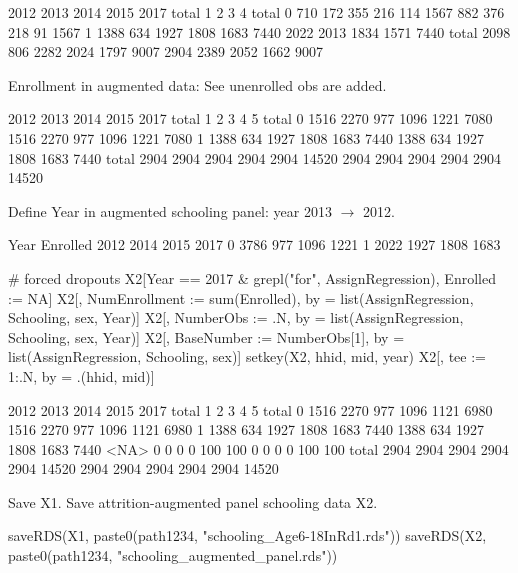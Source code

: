 \begin{Schunk}
\begin{Soutput}
      2012 2013 2014 2015 2017 total    1    2    3    4 total
0      710  172  355  216  114  1567  882  376  218   91  1567
1     1388  634 1927 1808 1683  7440 2022 2013 1834 1571  7440
total 2098  806 2282 2024 1797  9007 2904 2389 2052 1662  9007
\end{Soutput}
\end{Schunk}
Enrollment in augmented data: See unenrolled obs are added.
\begin{Schunk}
\begin{Soutput}
      2012 2013 2014 2015 2017 total    1    2    3    4    5 total
0     1516 2270  977 1096 1221  7080 1516 2270  977 1096 1221  7080
1     1388  634 1927 1808 1683  7440 1388  634 1927 1808 1683  7440
total 2904 2904 2904 2904 2904 14520 2904 2904 2904 2904 2904 14520
\end{Soutput}
\end{Schunk}
Define \textsf{Year} in augmented schooling panel: year 2013 $\rightarrow$ 2012.
\begin{Schunk}
\begin{Soutput}
        Year
Enrolled 2012 2014 2015 2017
       0 3786  977 1096 1221
       1 2022 1927 1808 1683
\end{Soutput}
\end{Schunk}
\begin{Schunk}
\begin{Sinput}
# forced dropouts
X2[Year == 2017 & grepl("for", AssignRegression), Enrolled := NA]
X2[, NumEnrollment := sum(Enrolled), by = list(AssignRegression, Schooling, sex, Year)]
X2[, NumberObs := .N, by = list(AssignRegression, Schooling, sex, Year)]
X2[, BaseNumber := NumberObs[1], by = list(AssignRegression, Schooling, sex)]
setkey(X2, hhid, mid, year)
X2[, tee := 1:.N, by = .(hhid, mid)]
\end{Sinput}
\end{Schunk}
\begin{Schunk}
\begin{Soutput}
      2012 2013 2014 2015 2017 total    1    2    3    4    5 total
0     1516 2270  977 1096 1121  6980 1516 2270  977 1096 1121  6980
1     1388  634 1927 1808 1683  7440 1388  634 1927 1808 1683  7440
<NA>     0    0    0    0  100   100    0    0    0    0  100   100
total 2904 2904 2904 2904 2904 14520 2904 2904 2904 2904 2904 14520
\end{Soutput}
\end{Schunk}
Save X1. Save attrition-augmented panel schooling data X2.
\begin{Schunk}
\begin{Sinput}
saveRDS(X1, paste0(path1234, "schooling_Age6-18InRd1.rds"))
saveRDS(X2, paste0(path1234, "schooling_augmented_panel.rds"))
\end{Sinput}
\end{Schunk}


